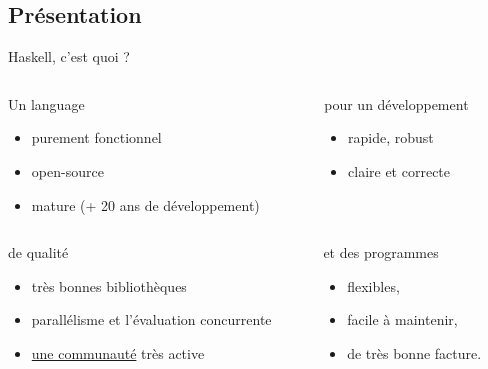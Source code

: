 \documentclass[presentation]{beamer}
\begin{document}
\subsection{Présentation}
\label{sec:org089e3c7}
\begin{frame}[label={sec:org34271cd}]{Haskell, c'est quoi ?}
\begin{block}{}
\begin{columns}
\begin{column}{0.5\columnwidth}
\begin{block}{Un language}
\begin{itemize}
\item purement fonctionnel
\item open-source
\item mature (+ 20 ans de développement)
\end{itemize}
\end{block}
\end{column}
\begin{column}{0.5\columnwidth}
\begin{block}{pour un développement}
\begin{itemize}
\item rapide,  robust
\end{itemize}

\begin{itemize}
\item claire et  correcte
\end{itemize}
\end{block}
\end{column}
\end{columns}
\end{block}
\begin{block}{}
\begin{columns}
\begin{column}{0.6\columnwidth}
\begin{block}{de qualité}
\begin{itemize}
\item très bonnes bibliothèques
\item parallélisme et l'évaluation concurrente
\item \href{https://wiki.haskell.org/Haskell}{une communauté} très active
\end{itemize}
\end{block}
\end{column}

\begin{column}{0.4\columnwidth}
\begin{block}{et des programmes}
\begin{itemize}
\item flexibles,
\item facile à maintenir,
\item de très bonne facture.
\end{itemize}
\end{block}
\end{column}
\end{columns}
\end{block}
\end{frame}
\end{document}
